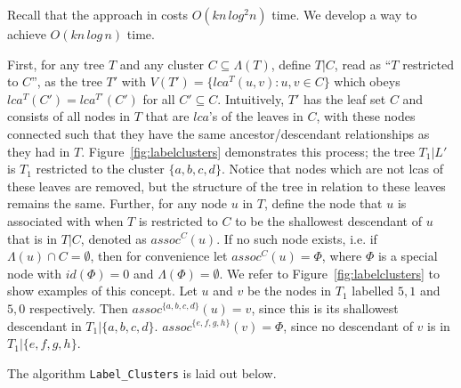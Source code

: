 \documentclass{article}
\newcommand{\leafset}{\Lambda}
\begin{document}
    Recall that the approach in \cite{gawrychowski2017faster} costs $O(kn\,log^2n)$ time. We develop a way to achieve $O(kn\,log\,n)$ time.

    First, for any tree $T$ and any cluster $C \subseteq \leafset(T)$, define $T|C$, read as ``$T$ restricted to $C$'', as the tree $T'$ with $V(T') = \{lca^T(u, v) : u, v \in C\}$ which obeys $lca^T(C') = lca^{T'}(C')$ for all $C' \subseteq C$. Intuitively, $T'$ has the leaf set $C$ and consists of all nodes in $T$ that are $lca$'s of the leaves in $C$, with these nodes connected such that they have the same ancestor/descendant relationships as they had in $T$. Figure~\ref{fig:labelclusters} demonstrates this process; the tree $T_1|L'$ is $T_1$ restricted to the cluster $\{a, b, c, d\}$. Notice that nodes which are not lcas of these leaves are removed, but the structure of the tree in relation to these leaves remains the same. Further, for any node $u$ in $T$, define the node that $u$ is associated with when $T$ is restricted to $C$ to be the shallowest descendant of $u$ that is in $T|C$, denoted as $assoc^{C}(u)$. If no such node exists, i.e. if $\leafset(u) \cap C = \emptyset$, then for convenience let $assoc^{C}(u) = \Phi$, where $\Phi$ is a special node with $id(\Phi) = 0$ and $\leafset(\Phi) = \emptyset$. We refer to Figure~\ref{fig:labelclusters} to show examples of this concept. Let $u$ and $v$ be the nodes in $T_1$ labelled $5, 1$ and $5, 0$ respectively. Then $assoc^{\{a, b, c, d\}}(u) = v$, since this is its shallowest descendant in $T_1|\{a, b, c, d\}$. $assoc^{\{e, f, g, h\}}(v) = \Phi$, since no descendant of $v$ is in $T_1|\{e, f, g, h\}$.

    The algorithm \texttt{Label\_Clusters} is laid out below.
\end{document}
